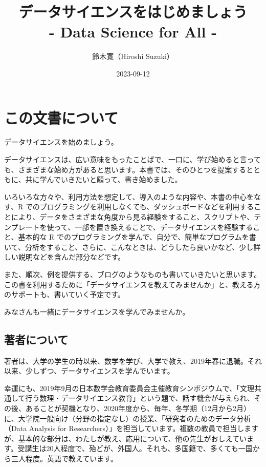 \documentclass[
  xelatex, ja=standard]{bxjsbook}
\title{データサイエンスをはじめましょう\\
- Data Science for All -}
\author{鈴木寛（Hiroshi Suzuki）}
\date{2023-09-12}
\theoremstyle{definition}
\theoremstyle{definition}
\theoremstyle{definition}
\theoremstyle{definition}
\theoremstyle{remark}
\begin{document}
\maketitle

{
\setcounter{tocdepth}{1}
\tableofcontents
}
\hypertarget{ux3053ux306eux6587ux66f8ux306bux3064ux3044ux3066}{%
\chapter*{この文書について}\label{ux3053ux306eux6587ux66f8ux306bux3064ux3044ux3066}}

データサイエンスを始めましょう。

データサイエンスは、広い意味をもったことばで、一口に、学び始めると言っても、さまざまな始め方があると思います。本書では、そのひとつを提案するとともに、共に学んでいきたいと願って、書き始めました。

いろいろな方々や、利用方法を想定して、導入のような内容や、本書の中心をなす、R でのプログラミングを利用しなくても、ダッシュボードなどを利用することにより、データをさまざまな角度から見る経験をすること、スクリプトや、テンプレートを使って、一部を置き換えることで、データサイエンスを経験すること、基本的な R でのプログラミングを学んで、自分で、簡単なプログラムを書いて、分析をすること、さらに、こんなときは、どうしたら良いかなど、少し詳しい説明などを含んだ部分などです。

また、順次、例を提供する、ブログのようなものも書いていきたいと思います。この書を利用するために「データサイエンスを教えてみませんか」と、教える方のサポートも、書いていく予定です。

みなさんも一緒にデータサイエンスを学んでみませんか。

\hypertarget{ux8457ux8005ux306bux3064ux3044ux3066}{%
\section*{著者について}\label{ux8457ux8005ux306bux3064ux3044ux3066}}

著者は、大学の学生の時以来、数学を学び、大学で教え、2019年春に退職。それ以来、少しずつ、データサイエンスを学んでいます。

幸運にも、2019年9月の日本数学会教育委員会主催教育シンポジウムで、「文理共通して行う数理・データサイエンス教育」という題で、話す機会が与えられ、その後、あることが契機となり、2020年度から、毎年、冬学期（12月から2月）に、大学院一般向け（分野の指定なし）の授業、「研究者のためのデータ分析（Data Analysis for Researchers）」を担当しています。複数の教員で担当しますが、基本的な部分は、わたしが教え、応用について、他の先生がおしえています。受講生は20人程度で、殆どが、外国人。それも、多国籍で、多くても一国から三人程度。英語で教えています。
\end{document}

